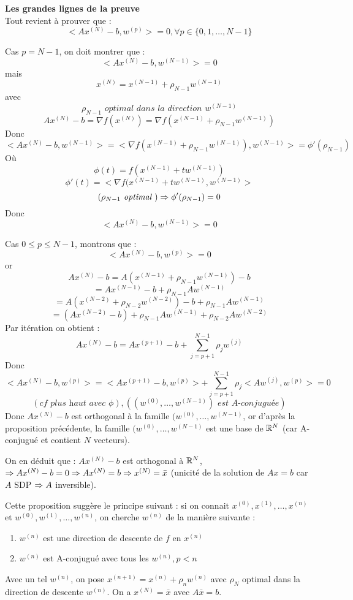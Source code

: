 \textbf{Les grandes lignes de la preuve}\\
Tout revient à prouver que :
\[<Ax^{(N)}-b,w^{(p)}> = 0, \forall p \in \{0,1,\dots,N-1\}\]

Cas $p=N-1$, on doit montrer que :
\[<Ax^{(N)}-b,w^{(N-1)}> = 0\]
mais \[ x^{(N)}=x^{(N-1)}+\rho_{N-1}w^{(N-1)} \]
avec \[ \rho_{N-1} \textit{ optimal dans la direction } w^{(N-1)} \] 
\[ Ax^{(N)}-b=\nabla f(x^{(N)}) = \nabla f(x^{(N-1)}+\rho_{N-1}w^{(N-1)}) \]
Donc \[ <Ax^{(N)}-b,w^{(N-1)}> = <\nabla f(x^{(N-1)}+\rho_{N-1}w^{(N-1)}), w^{(N-1)}>=\phi '(\rho_{N-1}) \]
Où \[ \phi (t)=f(x^{(N-1)}+tw^{(N-1)}) \]
\[ \phi'(t)=<\nabla f(x^{(N-1)}+tw^{(N-1)}, w^{(N-1)}>\]
\[ (\rho_{N-1} \textit{ optimal }) \Rightarrow \phi'(\rho_{N-1})=0 \]
Donc \[ <Ax^{(N)}-b,w^{(N-1)}>=0 \]

Cas $0\leq p \leq N-1$, montrons que :
\[ <Ax^{(N)}-b,w^{(p)}>=0 \]
or \[ Ax^{(N)}-b=A(x^{(N-1)}+\rho_{N-1}w^{(N-1)})-b \]
\[ =Ax^{(N-1)}-b+\rho_{N-1}Aw^{(N-1)} \]
\[ =A(x^{(N-2)}+\rho_{N-2}w^{(N-2)})-b+\rho_{N-1}Aw^{(N-1)} \]
\[ =(Ax^{(N-2)}-b)+\rho_{N-1}Aw^{(N-1)}+\rho_{N-2}Aw^{(N-2)} \]
Par itération on obtient :
\[ Ax^{(N)}-b=Ax^{(p+1)}-b+\sum_{j=p+1}^{N-1}\rho_jw^{(j)} \]
Donc \[ <Ax^{(N)}-b,w^{(p)}>=<Ax^{(p+1)}-b,w^{(p)}>+\sum_{j=p+1}^{N-1}\rho_j<Aw^{(j)},w^{(p)}>=0 \]
\[(\textit{cf plus haut avec }\phi), ((w^{(0)}, \dots, w^{(N-1)}) \textit{ est A-conjuguée}) \]
Donc $Ax^{(N)}-b$ est orthogonal à la famille $(w^{(0)}, \dots, w^{(N-1)}$, or d'après la proposition précédente, la famille $(w^{(0)}, \dots, w^{(N-1)}$ est une base de $\mathbb{R}^N$ (car A-conjugué et contient $N$ vecteurs).

On en déduit que : $Ax^{(N)}-b$ est orthogonal à $\mathbb{R}^N$, $\Rightarrow Ax^{(N)}-b=0 \Rightarrow Ax^{(N)}=b \Rightarrow x^{(N)}=\bar{x}$ (unicité de la solution de $Ax=b$ car $A$ SDP $\Rightarrow A$ inversible).

\begin{remarque}
Cette proposition suggère le principe suivant : si on connait $x^{(0)}, x^{(1)}, \dots, x^{(n)}$ et $w^{(0)}, w^{(1)}, \dots, w^{(n)}$, on cherche $w^{(n)}$ de la manière suivante :
\begin{enumerate}
\item $w^{(n)}$ est une direction de descente de $f$ en $x^{(n)}$
\item $w^{(n)}$ est A-conjugué avec tous les $w^{(n)}, p<n$
\end{enumerate}
Avec un tel $w^{(n)}$, on pose $x^{(n+1)}=x^{(n)}+\rho_nw^{(n)}$ avec $\rho_N$ optimal dans la direction de descente $w^{(n)}$. On a $x^{(N)}=\bar{x}$ avec $A\bar{x}=b$.
\end{remarque}

